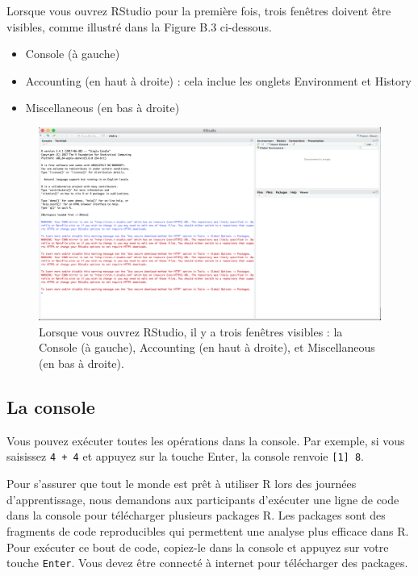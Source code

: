 \documentclass[12pt,]{book}
\providecommand{\tightlist}{%
  \setlength{\itemsep}{0pt}\setlength{\parskip}{0pt}}
\begin{document}
Lorsque vous ouvrez RStudio pour la première fois, trois fenêtres doivent être visibles, comme illustré dans la Figure B.3 ci-dessous.

\begin{itemize}
\tightlist
\item
  Console (à gauche)
\item
  Accounting (en haut à droite) : cela inclue les onglets Environment et History
\item
  Miscellaneous (en bas à droite)
\end{itemize}

\begin{figure}
\includegraphics[width=0.8\linewidth]{Images/rstudio_intro} \caption{Lorsque vous ouvrez RStudio, il y a trois fenêtres visibles : la Console (à gauche), Accounting (en haut à droite), et Miscellaneous (en bas à droite).}\label{fig:rstudiointro}
\end{figure}

\hypertarget{la-console}{%
\subsection{La console}\label{la-console}}

Vous pouvez exécuter toutes les opérations dans la console. Par exemple, si vous saisissez \texttt{4\ +\ 4} et appuyez sur la touche Enter, la console renvoie \texttt{{[}1{]}\ 8}.

Pour s'assurer que tout le monde est prêt à utiliser R lors des journées d'apprentissage, nous demandons aux participants d'exécuter une ligne de code dans la console pour télécharger plusieurs packages R. Les packages sont des fragments de code reproducibles qui permettent une analyse plus efficace dans R. Pour exécuter ce bout de code, copiez-le dans la console et appuyez sur votre touche \texttt{Enter}. Vous devez être connecté à internet pour télécharger des packages.
\end{document}
